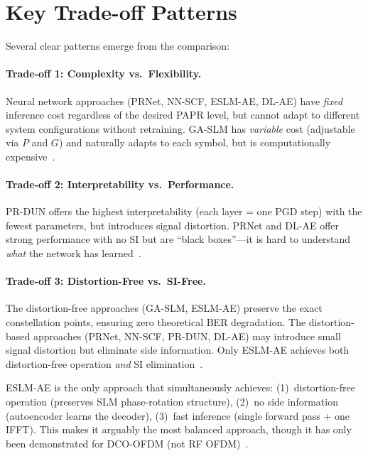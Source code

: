 \section{Key Trade-off Patterns}
\label{sec:tradeoff_patterns}

Several clear patterns emerge from the comparison:

\paragraph{Trade-off 1: Complexity vs.\ Flexibility.}
Neural network approaches (PRNet, NN-SCF, ESLM-AE, DL-AE) have
\emph{fixed} inference cost regardless of the desired PAPR level, but
cannot adapt to different system configurations without retraining.
GA-SLM has \emph{variable} cost (adjustable via $P$ and $G$) and
naturally adapts to each symbol, but is computationally
expensive~\cite{ali2016new,kim2017novel}.

\paragraph{Trade-off 2: Interpretability vs.\ Performance.}
PR-DUN offers the highest interpretability (each layer = one PGD step)
with the fewest parameters, but introduces signal distortion.
PRNet and DL-AE offer strong performance with no SI but are
``black boxes''---it is hard to understand \emph{what} the network
has learned~\cite{nguyen2022deep,kim2017novel}.

\paragraph{Trade-off 3: Distortion-Free vs.\ SI-Free.}
The distortion-free approaches (GA-SLM, ESLM-AE) preserve the exact
constellation points, ensuring zero theoretical BER degradation.
The distortion-based approaches (PRNet, NN-SCF, PR-DUN, DL-AE) may
introduce small signal distortion but eliminate side information.
Only ESLM-AE achieves both distortion-free operation \emph{and}
SI elimination~\cite{hao2019extended}.

\begin{keyinsight}
    ESLM-AE is the only approach that simultaneously achieves:
    (1)~distortion-free operation (preserves SLM phase-rotation structure),
    (2)~no side information (autoencoder learns the decoder),
    (3)~fast inference (single forward pass + one IFFT).
    This makes it arguably the most balanced approach,
    though it has only been demonstrated for DCO-OFDM
    (not RF OFDM)~\cite{hao2019extended}.
\end{keyinsight}


